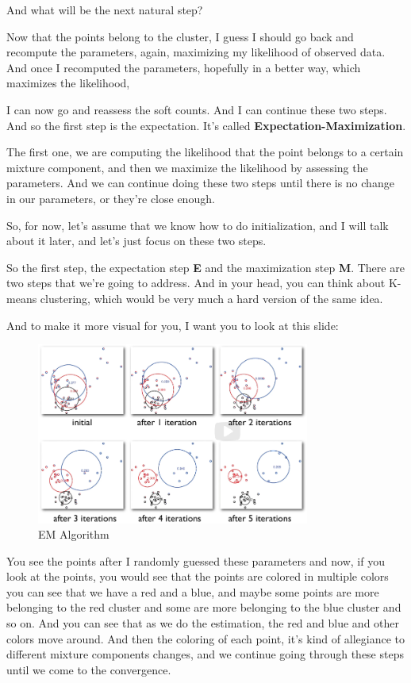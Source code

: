 \documentclass[a4paper, 12pt]{article}
\begin{document}
And what will be the next natural step?

Now that the points belong to the cluster, I guess I should go back and
recompute the parameters, again, maximizing my likelihood of observed data. And
once I recomputed the parameters, hopefully in a better way, which maximizes the
likelihood,

I can now go and reassess the soft counts. And I can continue these two steps.
And so the first step is the expectation. It's called \textbf{Expectation-Maximization}.

The first one, we are computing the likelihood that the point belongs to a
certain mixture component, and then we maximize the likelihood by assessing the
parameters. And we can continue doing these two steps until there is no change
in our parameters, or they're close enough.

So, for now, let's assume that we know how to do initialization, and I will talk
about it later, and let's just focus on these two steps.

So the first step, the expectation step \textbf{E} and the maximization step \textbf{M}. There
are two steps that we're going to address. And in your head, you can think about
K-means clustering, which would be very much a hard version of the same idea.

And to make it more visual for you, I want you to look at this slide:

\begin{figure}[H]
\centering
\includegraphics[width=0.8\textwidth]{./pic/u04-05-fig-01.png}
\caption{\label{fig:org5d6dd08}EM Algorithm}
\end{figure}

You see the points after I randomly guessed these parameters and now, if you
look at the points, you would see that the points are colored in multiple colors
you can see that we have a red and a blue, and maybe some points are more
belonging to the red cluster and some are more belonging to the blue cluster and
so on. And you can see that as we do the estimation, the red and blue and other
colors move around. And then the coloring of each point, it's kind of allegiance
to different mixture components changes, and we continue going through these
steps until we come to the convergence.
\end{document}
